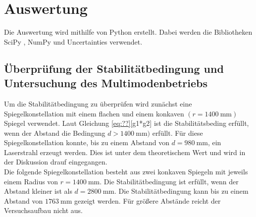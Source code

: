 \section{Auswertung}
\label{sec:Auswertung}
Die Auswertung wird mithilfe von Python erstellt. Dabei werden die Bibliotheken SciPy \cite{??}, NumPy \cite{??} und 
Uncertainties \cite{??} verwendet. 
\subsection{Überprüfung der Stabilitätbedingung und Untersuchung des Multimodenbetriebs}
Um die Stabilitätbedingung zu überprüfen wird zunächst eine Spiegelkonstellation mit einem flachen 
und einem konkaven $(r=\SI{1400}{\milli\meter})$ Spiegel verwendet. Laut Gleichung \eqref{eq:??}[g1*g2] ist die 
Stabilitätsbeding erfüllt, wenn der Abstand die Bedingung $d>\SI{1400}{\milli\meter})$ erfüllt.
Für diese Spiegelkonstellation konnte, bis zu einem Abstand von $d=\SI{980}{\milli\meter}$, ein Laserstrahl erzeugt werden.
Dies ist unter dem theoretischem Wert und wird in der Diskussion drauf eingegangen.\\
Die folgende Spiegelkonstellation besteht aus zwei konkaven Spiegeln mit jeweils einem Radius von $r=\SI{1400}{\milli\meter}$.
Die Stabilitätbedingung ist erfüllt, wenn der Abstand kleiner ist als $d = \SI{2800}{\milli\meter}$. 
Die Stabilitätbedingung kann bis zu einem Abstand von $\SI{1763}{\milli\meter}$ gezeigt werden. Für größere 
Abstände reicht der Versuchsaufbau nicht aus.
